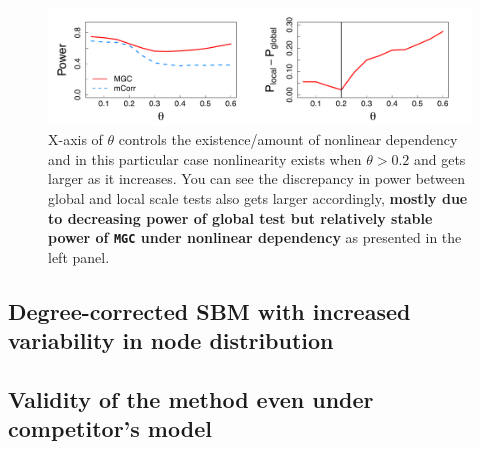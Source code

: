 \documentclass[12pt]{article}
\begin{document}
\begin{figure}[h]
	\centering
	\includegraphics[width=\linewidth]{../../Figure/powerplot_simple.pdf}
	\caption{X-axis of $\theta$ controls the existence/amount of nonlinear dependency and in this particular case nonlinearity exists when $\theta > 0.2$ and gets larger as it increases. You can see the discrepancy in power between global and local scale tests also gets larger accordingly, \textbf{mostly due to decreasing power of global test but relatively stable power of \texttt{MGC} under nonlinear dependency} as presented in the left panel.}
	\label{fig:powerplot}
\end{figure}


\subsection*{Degree-corrected SBM with increased variability in node distribution}	
\subsection*{Validity of the method even under competitor's model}
\end{document}
